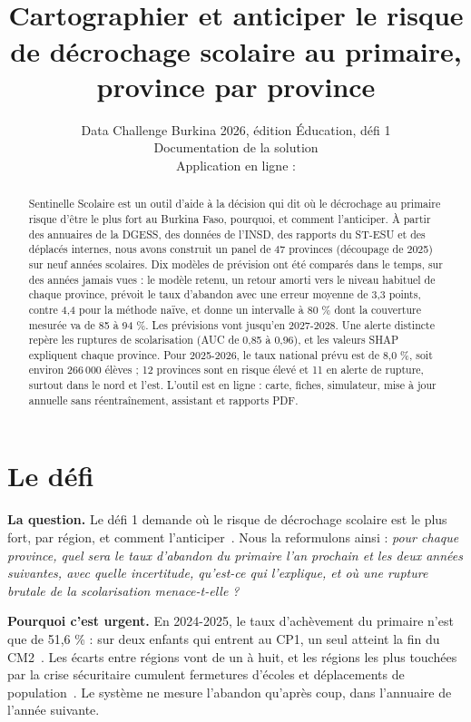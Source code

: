 \documentclass{article}
\title{\sol{}\\[3pt]
{\large\mdseries Cartographier et anticiper le risque de décrochage scolaire au primaire, province par province}}
\author{
Data Challenge Burkina 2026, édition Éducation, défi 1\\
\affiliations
Documentation de la solution \\
Application en ligne : \lien
}
\renewcommand{\tablename}{Tableau}%
\renewcommand{\figurename}{Figure}%
\renewcommand{\refname}{Références}%
\newcommand{\sol}{Sentinelle Scolaire}
\begin{document}
\renewcommand{\tablename}{Tableau}\renewcommand{\figurename}{Figure}\renewcommand{\refname}{Références}
\raggedbottom

\maketitle
\thispagestyle{plain}
\pagestyle{plain}

\begin{abstract}
\sol{} est un outil d'aide à la décision qui dit où le décrochage au primaire risque d'être le plus fort au Burkina Faso, pourquoi, et comment l'anticiper. À partir des annuaires de la DGESS, des données de l'INSD, des rapports du ST-ESU et des déplacés internes, nous avons construit un panel de 47 provinces (découpage de 2025) sur neuf années scolaires. Dix modèles de prévision ont été comparés dans le temps, sur des années jamais vues : le modèle retenu, un retour amorti vers le niveau habituel de chaque province, prévoit le taux d'abandon avec une erreur moyenne de 3,3 points, contre 4,4 pour la méthode naïve, et donne un intervalle à 80 \% dont la couverture mesurée va de 85 à 94 \%. Les prévisions vont jusqu'en 2027-2028. Une alerte distincte repère les ruptures de scolarisation (AUC de 0,85 à 0,96), et les valeurs SHAP expliquent chaque province. Pour 2025-2026, le taux national prévu est de 8,0 \%, soit environ 266\,000 élèves ; 12 provinces sont en risque élevé et 11 en alerte de rupture, surtout dans le nord et l'est. L'outil est en ligne : carte, fiches, simulateur, mise à jour annuelle sans réentraînement, assistant et rapports PDF.
\end{abstract}

\section{Le défi}

\textbf{La question.} Le défi 1 demande où le risque de décrochage scolaire est le plus fort, par région, et comment l'anticiper~\cite{dcb_document}. Nous la reformulons ainsi : \emph{pour chaque province, quel sera le taux d'abandon du primaire l'an prochain et les deux années suivantes, avec quelle incertitude, qu'est-ce qui l'explique, et où une rupture brutale de la scolarisation menace-t-elle ?}

\textbf{Pourquoi c'est urgent.} En 2024-2025, le taux d'achèvement du primaire n'est que de 51,6 \% : sur deux enfants qui entrent au CP1, un seul atteint la fin du CM2~\cite{dgess_base}. Les écarts entre régions vont de un à huit, et les régions les plus touchées par la crise sécuritaire cumulent fermetures d'écoles et déplacements de population~\cite{stesu,conasur}. Le système ne mesure l'abandon qu'après coup, dans l'annuaire de l'année suivante.
\end{document}
